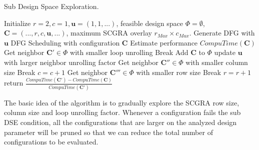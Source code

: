 \begin{algorithm}[h]
\caption{Sub Design Space Exploration.}
\label{alg:revenuealg}
\begin{algorithmic}
\PROCEDURE{}
\STATE Initialize $r=2, c=1, \bm{u}=(1,1,...)$, feasible design space $\Phi=\emptyset$,
$\bm{C}=(...,r,c,\bm{u},...)$, maximum SCGRA overlay $r_{Max}\times c_{Max}$.
\STATE Generate DFG with $\bm{u}$
\STATE DFG Scheduling with configuration $\bm{C}$
\STATE Estimate performance $CompuTime(\bm{C})$
\STATE Get neighbor $\bm{C'} \in \Phi$ with smaller loop unrolling
\STATE Break
\ELSE 
\STATE Add $\bm{C}$ to $\Phi$
\ENDIF
\STATE update $\bm{u}$ with larger neighbor unrolling factor
\ENDWHILE
\STATE Get neighbor $\bm{C''} \in \Phi$ with smaller column size
\STATE Break
\ENDIF
\STATE $c=c+1$
\ENDWHILE
\STATE Get neighbor $\bm{C'''} \in \Phi$ with smaller row size
\STATE Break
\ENDIF
\STATE $r=r+1$
\ENDWHILE
\ENDPROCEDURE
\STATE
{}
\STATE return $\frac{CompuTime(\bm{C'})-CompuTime(\bm{C})}{CompuTime(\bm{C'})}$ 
\ENDPROCEDURE
\end{algorithmic}
\end{algorithm}

The basic idea of the algorithm is to gradually explore the SCGRA row size, column size 
and loop unrolling factor. Whenever a configuration fails the sub DSE condition, 
all the configurations that are larger on the analyzed design parameter will be pruned so 
that we can reduce the total number of configurations to be evaluated.
